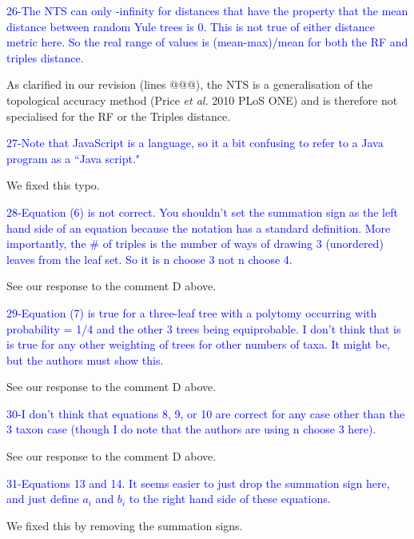 \documentclass[11pt]{letter}
\begin{document}
\begin{letter}{}
\textcolor{blue}{26-The NTS can only -infinity for distances that have the property that the mean distance between random Yule trees is 0. This is not true of either distance metric here. So the real range of values is (mean-max)/mean for both the RF and triples distance.}

As clarified in our revision (lines @@@), the NTS is a generalisation of the topological accuracy method (Price \textit{et al.} 2010 PLoS ONE) and is therefore not specialised for the RF or the Triples distance.

\textcolor{blue}{27-Note that JavaScript is a language, so it a bit confusing to refer to a Java program as a ``Java script."}

We fixed this typo.

\textcolor{blue}{28-Equation (6) is not correct. You shouldn't set the summation sign as the left hand side of an equation because the notation has a standard definition. More importantly, the $\#$ of triples is the number of ways of drawing 3 (unordered) leaves from the leaf set. So it is n choose 3 not n choose 4.}

See our response to the comment D above.

\textcolor{blue}{29-Equation (7) is true for a three-leaf tree with a polytomy occurring with probability = 1/4 and the other 3 trees being equiprobable. I don't think that is is true for any other weighting of trees for other numbers of taxa. It might be, but the authors must show this.}

See our response to the comment D above.

\textcolor{blue}{30-I don't think that equations 8, 9, or 10 are correct for any case other than the 3 taxon case (though I do note that the authors are using n choose 3 here).}

See our response to the comment D above.

\textcolor{blue}{31-Equations 13 and 14. It seems easier to just drop the summation sign here, and just define $a_i$ and $b_i$ to the right hand side of these equations.}

We fixed this by removing the summation signs.


\end{letter}
\end{document}
